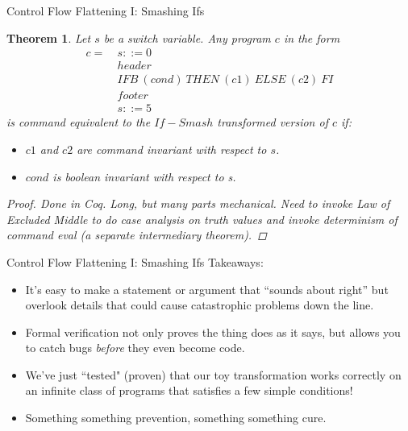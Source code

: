 \documentclass[10pt,handout]{beamer}
\theoremstyle{plain}
\newtheorem{theo}{Theorem}[section]
\theoremstyle{definition}
\begin{document}
\begin{frame}{Control Flow Flattening I: Smashing Ifs}
\begin{theo}
Let $s$ be a switch variable.  Any program $c$ in the form
\begin{align*}
	c =&\ s ::= 0 \\
    &\ header \\
    &\ IFB\ (cond)\ THEN\ (c1)\ ELSE\ (c2)\ FI \\
    &\ footer \\
    &\ s ::= 5 
\end{align*}
       is command equivalent to the $If-Smash$ transformed version of $c$ if:
       \begin{itemize}
       		\item $c1$ and $c2$ are command invariant with respect to $s$.
            \item $cond$ is boolean invariant with respect to s.
       \end{itemize}
\begin{proof}
	Done in Coq.  Long, but many parts mechanical.  Need to invoke Law of Excluded Middle to do case analysis on truth values and invoke determinism of command eval (a separate intermediary theorem).
\end{proof}
\end{theo}
\end{frame}

\begin{frame}{Control Flow Flattening I: Smashing Ifs}
Takeaways:
\begin{itemize}
	\item It's easy to make a statement or argument that ``sounds about right'' but overlook details that could cause catastrophic problems down the line. \pause
    \item Formal verification not only proves the thing does as it says, but allows you to catch bugs \emph{before} they even become code. \pause
    \item We've just ``tested" (proven) that our toy transformation works correctly on an infinite class of programs that satisfies a few simple conditions!\pause
    \item Something something prevention, something something cure.
\end{itemize}

\end{frame}
\end{document}
